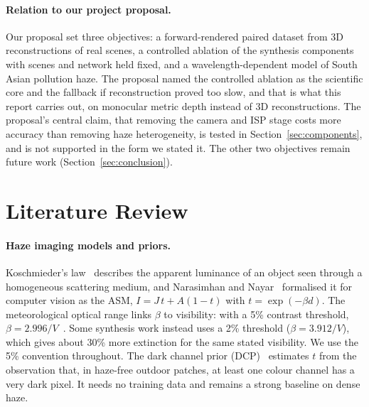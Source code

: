 \documentclass{article}
\begin{document}
\paragraph{Relation to our project proposal.} Our proposal set three objectives: a forward-rendered paired dataset from 3D reconstructions of real scenes, a controlled ablation of the synthesis components with scenes and network held fixed, and a wavelength-dependent model of South Asian pollution haze. The proposal named the controlled ablation as the scientific core and the fallback if reconstruction proved too slow, and that is what this report carries out, on monocular metric depth instead of 3D reconstructions. The proposal's central claim, that removing the camera and ISP stage costs more accuracy than removing haze heterogeneity, is tested in Section~\ref{sec:components}, and is not supported in the form we stated it. The other two objectives remain future work (Section~\ref{sec:conclusion}).

\section{Literature Review}
\label{sec:related}

\paragraph{Haze imaging models and priors.} Koschmieder's law~\cite{koschmieder1924} describes the apparent luminance of an object seen through a homogeneous scattering medium, and Narasimhan and Nayar~\cite{narasimhan2002vision} formalised it for computer vision as the ASM, $I = J\,t + A(1-t)$ with $t=\exp(-\beta d)$. The meteorological optical range links $\beta$ to visibility: with a 5\% contrast threshold, $\beta = 2.996/V$~\cite{wmo2018guide}. Some synthesis work instead uses a 2\% threshold ($\beta=3.912/V$), which gives about 30\% more extinction for the same stated visibility. We use the 5\% convention throughout. The dark channel prior (DCP)~\cite{he2011dcp} estimates $t$ from the observation that, in haze-free outdoor patches, at least one colour channel has a very dark pixel. It needs no training data and remains a strong baseline on dense haze.
\end{document}
